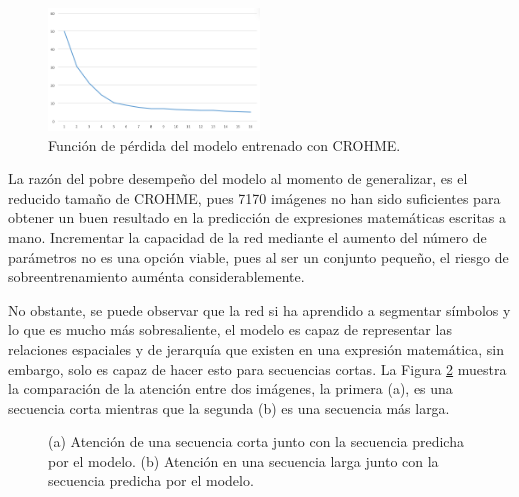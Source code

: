 \begin{figure}[H]
    \centering
    \includegraphics[width=0.5\textwidth]{capitulo5/modelo/img/modelo-crohme-loss}
    \caption{Función de pérdida del modelo entrenado con CROHME.}
    \label{fig:modelo-crohme-loss}
\end{figure}

La razón del pobre desempeño del modelo al momento de generalizar, es el reducido tamaño de CROHME, pues 7170 imágenes no han sido suficientes para obtener un buen resultado en la predicción de expresiones matemáticas escritas a mano. Incrementar la capacidad de la red mediante el aumento del número de parámetros no es una opción viable, pues al ser un conjunto pequeño, el riesgo de sobreentrenamiento auménta considerablemente.

No obstante, se puede observar que la red si ha aprendido a segmentar símbolos y lo que es mucho más sobresaliente, el modelo es capaz de representar las relaciones espaciales y de jerarquía que existen en una expresión matemática, sin embargo, solo es capaz de hacer esto para secuencias cortas. La Figura \ref{fig:modelo-crohme-attention} muestra la comparación de la atención entre dos imágenes, la primera (a), es una secuencia corta mientras que la segunda (b) es una secuencia más larga. 

\begin{figure}[H]
    \centering
    \caption{(a) Atención de una secuencia corta junto con la secuencia predicha por el modelo. (b) Atención en una secuencia larga junto con la secuencia predicha por el modelo.}
    \label{fig:modelo-crohme-attention}
\end{figure} 

